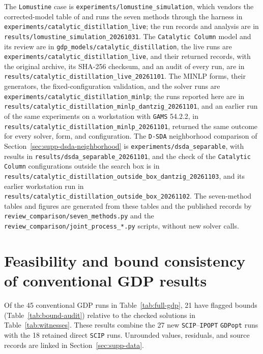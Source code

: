 The \texttt{Lomustine} case is \nolinkurl{experiments/lomustine_simulation}, which vendors the corrected-model table of \citet{secquoiaPdIsing} and runs the seven methods through the harness in \nolinkurl{experiments/catalytic_distillation_live}; the run records and analysis are in \nolinkurl{results/lomustine_simulation_20261031}.
The \texttt{Catalytic Column} model and its review are in \nolinkurl{gdp_models/catalytic_distillation}, the live runs are \nolinkurl{experiments/catalytic_distillation_live}, and their returned records, with the original archive, its SHA-256 checksum, and an audit of every run, are in \nolinkurl{results/catalytic_distillation_live_20261101}.
The MINLP forms, their generators, the fixed-configuration validation, and the solver runs are \nolinkurl{experiments/catalytic_distillation_minlp}; the runs reported here are in \nolinkurl{results/catalytic_distillation_minlp_dantzig_20261101}, and an earlier run of the same experiments on a workstation with \texttt{GAMS} 54.2.2, in \nolinkurl{results/catalytic_distillation_minlp_20261101}, returned the same outcome for every solver, form, and configuration.
The \texttt{D-SDA} neighborhood comparison of Section~\ref{sec:supp-dsda-neighborhood} is \nolinkurl{experiments/dsda_separable}, with results in \nolinkurl{results/dsda_separable_20261101}, and the check of the \texttt{Catalytic Column} configurations outside the search box is in \nolinkurl{results/catalytic_distillation_outside_box_dantzig_20261103}, and its earlier workstation run in \nolinkurl{results/catalytic_distillation_outside_box_20261102}.
The seven-method tables and figures are generated from these tables and the published records by \nolinkurl{review_comparison/seven_methods.py} and the \nolinkurl{review_comparison/joint_process_*.py} scripts, without new solver calls.

\section{Feasibility and bound consistency of conventional GDP results}\label{sec:bound-audit}
Of the 45 conventional GDP runs in Table~\ref{tab:full-gdp}, 21 have flagged bounds (Table~\ref{tab:bound-audit}) relative to the checked solutions in Table~\ref{tab:witnesses}.
These results combine the 27 new \texttt{SCIP}--\texttt{IPOPT} \texttt{GDPopt} runs with the 18 retained direct \texttt{SCIP} runs.
Unrounded values, residuals, and source records are linked in Section~\ref{sec:supp-data}.

